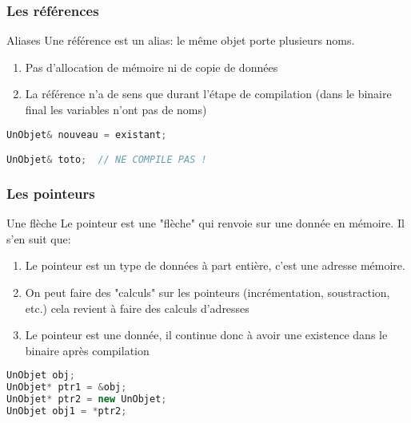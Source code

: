 \documentclass{beamer}
\begin{document}
\begin{frame}[fragile=singleslide,shrink=20]
\frametitle {Les références}

\begin{block}{Aliases}
Une référence est un alias: le même objet porte plusieurs noms.
\begin{enumerate}
\item Pas d'allocation de mémoire ni de copie de données
\item La référence n'a de sens que durant l'étape de compilation (dans le binaire final les variables n'ont pas de noms)
\end{enumerate}
\end{block}

\begin{lstlisting}[language=c++]
UnObjet& nouveau = existant;

UnObjet& toto;  // NE COMPILE PAS !
\end{lstlisting}
\end{frame}

\begin{frame}[fragile=singleslide,shrink=20]
\frametitle {Les pointeurs}

\begin{block}{Une flèche}
Le pointeur est une "flèche" qui renvoie sur une donnée en mémoire. Il s'en suit que:
\begin{enumerate}
\item Le pointeur est un type de données à part entière, c'est une adresse mémoire.
\item On peut faire des "calculs" sur les pointeurs (incrémentation, soustraction, etc.) cela revient à faire des calculs d'adresses
\item Le pointeur est une donnée, il continue donc à avoir une existence dans le binaire après compilation
\end{enumerate}
\end{block}

\begin{lstlisting}[language=c++]
UnObjet obj;
UnObjet* ptr1 = &obj;
UnObjet* ptr2 = new UnObjet;
UnObjet obj1 = *ptr2;
\end{lstlisting}
\end{frame}
\end{document}
